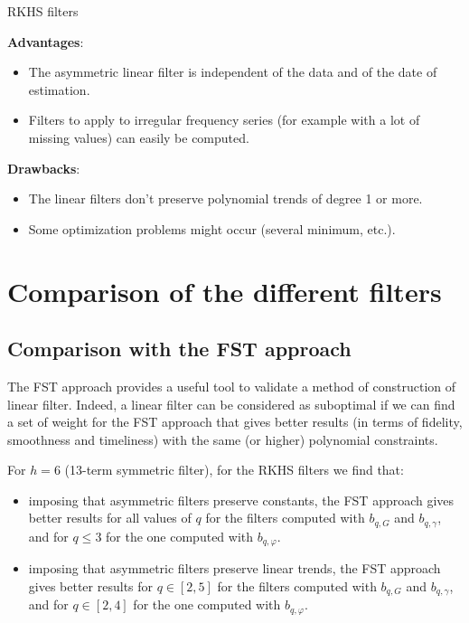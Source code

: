 \documentclass[
  12pt,
  ,
  a4paper]{article}
\newcommand\1{\mathds{1}}
\begin{document}
\begin{summary_box}{RKHS filters}

\textbf{Advantages}:

\begin{itemize}
\item
  The asymmetric linear filter is independent of the data and of the date of estimation.
\item
  Filters to apply to irregular frequency series (for example with a lot of missing values) can easily be computed.
\end{itemize}

\textbf{Drawbacks}:

\begin{itemize}
\item
  The linear filters don't preserve polynomial trends of degree 1 or more.
\item
  Some optimization problems might occur (several minimum, etc.).
\end{itemize}

\end{summary_box}

\hypertarget{sec:comparison}{%
\section{Comparison of the different filters}\label{sec:comparison}}

\hypertarget{comparison-with-the-fst-approach}{%
\subsection{Comparison with the FST approach}\label{comparison-with-the-fst-approach}}

The FST approach provides a useful tool to validate a method of construction of linear filter.
Indeed, a linear filter can be considered as suboptimal if we can find a set of weight for the FST approach that gives better results (in terms of fidelity, smoothness and timeliness) with the same (or higher) polynomial constraints.

For \(h=6\) (13-term symmetric filter), for the RKHS filters we find that:

\begin{itemize}
\item
  imposing that asymmetric filters preserve constants, the FST approach gives better results for all values of \(q\) for the filters computed with \(b_{q,G}\) and \(b_{q,\gamma}\), and for \(q\leq 3\) for the one computed with \(b_{q,\varphi}\).
\item
  imposing that asymmetric filters preserve linear trends, the FST approach gives better results for \(q\in[2,5]\) for the filters computed with \(b_{q,G}\) and \(b_{q,\gamma}\), and for \(q\in[2,4]\) for the one computed with \(b_{q,\varphi}\).
\end{itemize}
\end{document}
